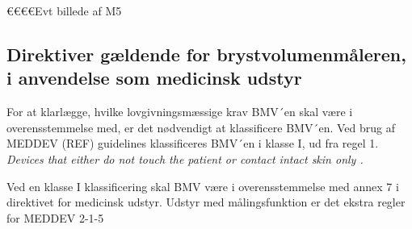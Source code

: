 €€€€Evt billede af M5

\subsection{Direktiver gældende for brystvolumenmåleren, i anvendelse som medicinsk udstyr}
For at klarlægge, hvilke lovgivningsmæssige krav BMV´en skal være i overensstemmelse med, er det nødvendigt at klassificere BMV´en. Ved brug af MEDDEV (REF) guidelines klassificeres BMV´en i klasse I, ud fra regel 1.  
\textit{Devices that either do not touch the patient or contact intact skin only .} 

Ved en klasse I klassificering skal BMV være i overensstemmelse med annex 7 i direktivet for medicinsk udstyr.
Udstyr med målingsfunktion er det ekstra regler for MEDDEV 2-1-5

